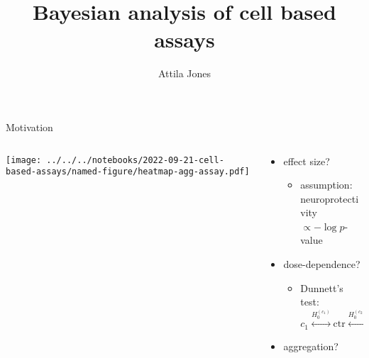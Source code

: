 \documentclass[aspectratio=169]{beamer}
\title{Bayesian analysis of cell based assays}
\subtitle{}
\author{Attila Jones}
\date{}
\begin{document}
\titlepage

\begin{frame}{Motivation}
\begin{columns}[t]
\begin{column}{0.5\textwidth}

\texttt{[image: ../../../notebooks/2022-09-21-cell-based-assays/named-figure/heatmap-agg-assay.pdf]}
\end{column}

\begin{column}{0.5\textwidth}
  \begin{itemize}
    \item effect size?
  \begin{itemize}
    \item assumption:\\neuroprotectivity $\propto -\log p$-value
  \end{itemize}
    \item dose-dependence?
  \begin{itemize}
    \item Dunnett's test: $c_1 \overset{H_0^{(c_1)}}{\leftrightarrow} \mathrm{ctr} \overset{H_0^{(c_2)}}{\leftrightarrow} c_2$
  \end{itemize}
    \item aggregation?
  \end{itemize}
\end{column}
\end{columns}
\end{frame}
\end{document}
